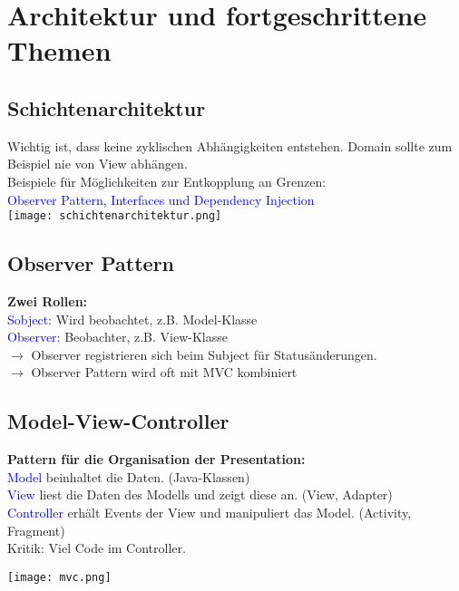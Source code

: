 
\section{Architektur und fortgeschrittene Themen}
\subsection{Schichtenarchitektur}
Wichtig ist, dass keine zyklischen Abhängigkeiten entstehen. Domain sollte zum Beispiel nie von View abhängen.\\
Beispiele für Möglichkeiten zur Entkopplung an Grenzen:\\
\textcolor{blue}{Observer Pattern, Interfaces und Dependency Injection}\\
\texttt{[image: schichtenarchitektur.png]}
\subsection{Observer Pattern}
\textbf{Zwei Rollen:}\\
\textcolor{blue}{Sobject:} Wird beobachtet, z.B. Model-Klasse\\
\textcolor{blue}{Observer:} Beobachter, z.B. View-Klasse\\
$\rightarrow$ Observer registrieren sich beim Subject für Statusänderungen.\\
$\rightarrow$ Observer Pattern wird oft mit MVC kombiniert
\subsection{Model-View-Controller}
\begin{minipage}{0.65\linewidth}
    \textbf{Pattern für die Organisation der Presentation:}\\
    \textcolor{blue}{Model} beinhaltet die Daten. (Java-Klassen)\\
    \textcolor{blue}{View} liest die Daten des Modells und zeigt diese an. (View, Adapter)\\
    \textcolor{blue}{Controller} erhält Events der View und manipuliert das Model. (Activity, Fragment)\\
    Kritik: Viel Code im Controller.
\end{minipage}
\begin{minipage}{0.3\linewidth}
    \texttt{[image: mvc.png]}
\end{minipage}
